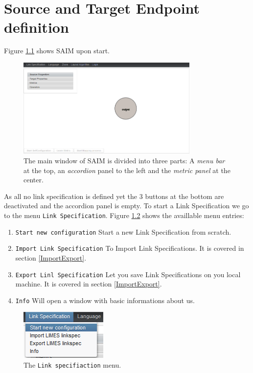 \documentclass[oneside,a4paper,12pt]{memoir}
\begin{document}
\chapter{Source and Target Endpoint definition}
\label{kbdefinition}
	Figure \ref{fig:MainWindow} shows SAIM upon start.
	\begin{figure}
		\centering
		\includegraphics[width=0.8\textwidth]{images/main.png}
		\caption{The main window of SAIM is divided into three parts: A \emph{menu bar} at the top, an \emph{accordion} panel to the left and the \emph{metric panel} at the center.}
		\label{fig:MainWindow}
	\end{figure}
	As all no link specification is defined yet the 3 buttons at the bottom are deactivated and the accordion panel is empty. To start a Link Specification we go to the menu \texttt{Link Specification}. Figure \ref{fig:menu_start} shows the availlable menu entries:
	
	\begin{enumerate}
		\item \texttt{Start new configuration} Start a new Link Specification from scratch.
		\item \texttt{Import Link Specification} To Import Link Specifications. It is covered in section \ref{ImportExport}.
		\item \texttt{Export Linl Specification} Let you save Link Specifications on you local machine. It is covered in section \ref{ImportExport}.
		\item \texttt{Info} Will open a window with basic informations about us.
	\end{enumerate}
	

	\begin{figure}
		\centering
		\includegraphics{images/menu_start.png}
		\caption{The \texttt{Link specifiaction} menu.}
		\label{fig:menu_start}
	\end{figure}
	
\end{document}
